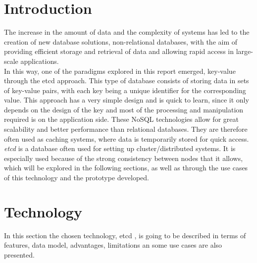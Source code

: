 \documentclass[screen,review]{acmart}
\begin{document}
\maketitle

\section{Introduction}
The increase in the amount of data and the complexity of systems has led to the creation of new database solutions, non-relational databases, with the aim of providing efficient storage and retrieval of data and allowing rapid access in large-scale applications. \\
In this way, one of the paradigms explored in this report emerged, key-value through the etcd approach.
This type of database consists of storing data in sets of key-value pairs, with each key being a unique identifier for the corresponding value.
This approach has a very simple design and is quick to learn, since it only depends on the design of the key and most of the processing and manipulation required is on the application side. These NoSQL technologies allow for great scalability and better performance than relational databases. They are therefore often used as caching systems, where data is temporarily stored for quick access.
\textit{etcd} is a database often used for setting up cluster/distributed systems. It is especially used because of the strong consistency between nodes that it allows, which will be explored in the following sections, as well as through the use cases of this technology and the prototype developed.
    
    
\section{Technology}
In this section the chosen technology, etcd \cite{etcd}, is going to be described in terms of features, data model, advantages, limitations an some use cases are also presented.
\end{document}

